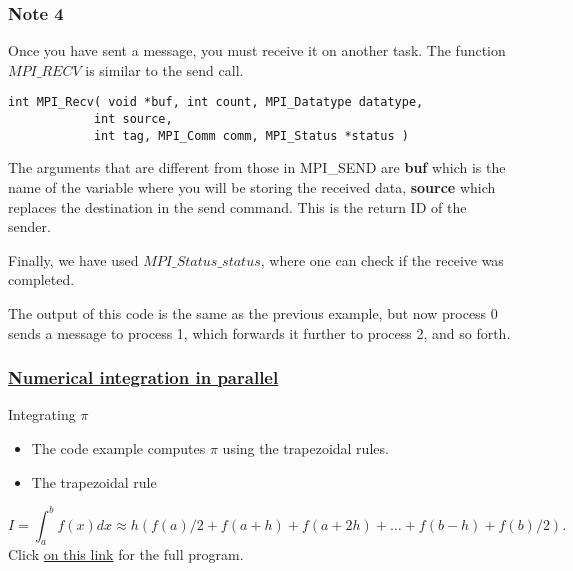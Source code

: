 \documentclass{beamer}
\begin{document}
\begin{frame}
\frametitle{Note 4}

\begin{block}{}

Once you have  sent a message, you must receive it on another task. The function $MPI\_RECV$
is similar to the send call.
\begin{verbatim}
int MPI_Recv( void *buf, int count, MPI_Datatype datatype, 
            int source, 
            int tag, MPI_Comm comm, MPI_Status *status )
\end{verbatim}

The arguments that are different from those in MPI\_SEND are
\textbf{buf} which  is the name of the variable where you will  be storing the received data, 
\textbf{source} which  replaces the destination in the send command. This is the return ID of the sender.

Finally,  we have used  $MPI\_Status\_status$,  
where one can check if the receive was completed.

The output of this code is the same as the previous example, but now
process 0 sends a message to process 1, which forwards it further
to process 2, and so forth.


\end{block}
\end{frame}

\begin{frame}
\frametitle{\href{{https://github.com/CompPhysics/ComputationalPhysics2/blob/gh-pages/doc/Programs/LecturePrograms/programs/MPI/chapter07/program6.cpp}}{Numerical integration in parallel}}

\begin{block}{Integrating $\pi$ }

\begin{itemize}
\item The code example computes $\pi$ using the trapezoidal rules.

\item The trapezoidal rule
\end{itemize}

\noindent
\[
   I=\int_a^bf(x) dx\approx h\left(f(a)/2 + f(a+h) +f(a+2h)+\dots +f(b-h)+ f(b)/2\right).
\]
Click \href{{https://github.com/CompPhysics/ComputationalPhysics2/blob/gh-pages/doc/Programs/LecturePrograms/programs/MPI/chapter07/program6.cpp}}{on this link} for the full program.

\end{block}
\end{frame}
\end{document}
